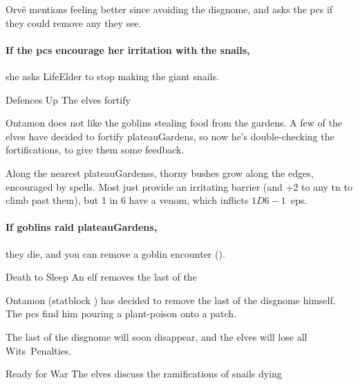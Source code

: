 \begin{multicols}{2}
Orv\"e mentions feeling better since avoiding the \gls{disgnome}, and asks the \glspl{pc} if they could remove any they see.


\paragraph{If the \glspl{pc} encourage her irritation with the snails,}
she asks \gls{LifeElder} to stop making the giant snails.


{Defences Up}%
{The elves fortify }%

Ontamon does not like the goblins stealing food from the gardens.
A few of the elves have decided to fortify \gls{plateauGardens}, so now he's double-checking the fortifications, to give them some feedback.

Along the nearest \glspl{plateauGardens}, thorny bushes grow along the edges, encouraged by \glspl{spell}.
Most just provide an irritating barrier (and +2 to any \gls{tn} to climb past them), but 1 in 6 have a venom, which inflicts $1D6-1$~\glspl{ep}.

\paragraph{If goblins raid \gls{plateauGardens},}
they die, and you can remove a goblin encounter ().

\label{ontamon}

{\small
  \showStdSpells
}

{Death to Sleep}%
{An elf removes the last of the }%

Ontamon (\gls{statblock} ) has decided to remove the last of the \gls{disgnome} himself.
The \glspl{pc} find him pouring a plant-poison onto a patch.

The last of the \gls{disgnome} will soon disappear, and the elves will lose all Wits~Penalties.

{Ready for War}%
{The elves discuss the ramifications of snails dying}%


\end{multicols}
